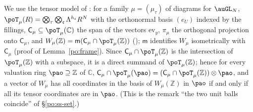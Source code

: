 \documentclass[10pt]{amsart}
\theoremstyle{definition}
\theoremstyle{remark}
\newcommand{\C}{\mathbb C}
\newcommand{\Z}{\mathbb Z}
\begin{document}
We use the tensor model of {\cite[\S5.2.6]{P49}}: for a family $\mu=(\mu_\tau)$ of diagrams for $\auGL_N$,
$\poT_\mu(R)=\bigotimes_{\tau}\bigotimes_{\mathfrak c}\Lambda^{h_{\mathfrak c}}R^N$ with the orthonormal basis
$(e_U)$ indexed by the fillings, $\mathsf C_\mu\subseteq\poT_\mu(\C)$ the span of the vectors
$\mathrm{ev}_y$, $\pi_\mu$ the orthogonal projection onto $\mathsf C_\mu$, and $W_\mu(\Z)=\mathsf m(\mathsf
C_\mu\cap\poT_\mu(\Z))$ ({\cite[(51)]{P49}}); $\mathsf m$ identifies $W_\mu$ isometrically with
$\mathsf C_\mu$ (proof of Lemma~\ref{po:frame}). Since $\mathsf C_\mu\cap\poT_\mu(\Z)$ is the intersection of
$\poT_\mu(\Z)$ with a subspace, it is a direct summand of $\poT_\mu(\Z)$; hence for every valuation
ring $\pao\supseteq\Z$ of $\C$, $\mathsf C_\mu\cap\poT_\mu(\pao)=(\mathsf C_\mu\cap\poT_\mu(\Z))\otimes\pao$,
and a vector of $W_\mu$ has all coordinates in the basis of $W_\mu(\Z)$ in $\pao$ if and only if all its
tensor coordinates are in $\pao$. (This is the remark ``the two unit balls coincide'' of
\S\ref{po:ss-set}.)
\end{document}
